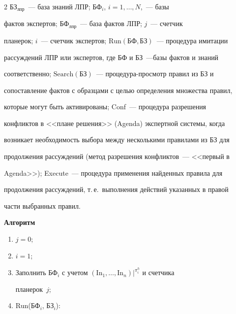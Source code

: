 \begin{multicols}{2}
БЗ$_{\mathrm{лпр}}$~--- база знаний ЛПР; БФ$_i$, $i = 1, \ldots , N$,~--- базы 


фактов экспертов; БФ$_{\mathrm{лпр}}$~--- база фактов ЛПР;  $j$~--- счетчик 


планерок; $i$~--- счетчик экспертов; $\mathrm{Run}(\mathrm{БФ,БЗ})$~--- процедура имитации\linebreak 


рассуждений ЛПР или экспертов, где БФ и БЗ~---\linebreak базы фактов и знаний 


соответственно; $\mathrm{Search}(\mathrm{БЗ})$~--- про\-це\-ду\-ра-про\-смотр правил из БЗ и 


сопоставление фактов с образцами с целью определения множества правил, 


которые могут быть активированы; Conf~--- процедура разрешения 


конфликтов в <<плане решения>> (Agenda) экспертной системы, когда 


возникает необходимость выбора между несколькими правилами из БЗ для 


продолжения рассуждений (метод разрешения конфликтов~--- <<первый в 


Agenda>>); Execute~--- процедура применения найден\-ных правила для 


продолжения рассуждений, т.\,е.\ выполнения действий указанных в правой 


части выбранных правил.





\smallskip


  


\noindent


  \textbf{Алгоритм}


  


  \noindent


  \begin{enumerate}[1)]


\item $j = 0$;


\item $i = 1$;


\item Заполнить БФ$_i$ с учетом $(\mathrm{In}_1, \ldots , \mathrm{In}_n)\vert^{\pi_i^h}$ и счетчика 


планерок~$j$;


\item Run(БФ$_i$,  БЗ$_i$):



\end{enumerate}
\end{multicols}
